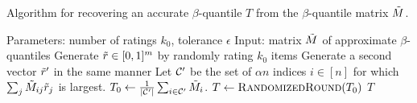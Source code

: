 \begin{algorithm}[t!]
\caption{Algorithm for recovering an accurate $\beta$-quantile $T$ from the $\beta$-quantile matrix $\tilde{M}$.}
\label{alg:recover-T}
\begin{algorithmic}[1]
\State Parameters: number of ratings $k_0$, tolerance $\epsilon$
\State Input: matrix $\tilde{M}$ of approximate $\beta$-quantiles
\State Generate $\tilde{r} \in [0,1]^m$ by randomly rating $k_0$ items
\State Generate a second vector $\tilde{r}'$ in the same manner
\State Let $\mathcal{C}'$ be the set of $\alpha n$ indices $i \in [n]$ for which 
       $\sum_j \tilde{M}_{ij}\tilde{r}_j$ is largest.
\State $T_0 \gets \frac{1}{|\mathcal{C}'|} \sum_{i \in \mathcal{C}'} \tilde{M}_i$. 
\State $T \gets \textsc{RandomizedRound}(T_0)$ 
\State \Return $T$
\EndIf
\EndWhile
\end{algorithmic}
\end{algorithm}
